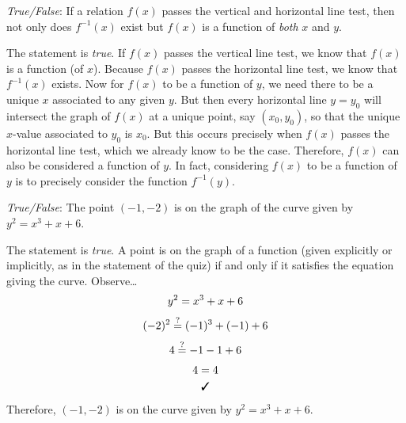 \documentclass[11pt,letterpaper]{article}
\begin{document}
\quizsol \textit{True/False}: If a relation $f(x)$ passes the vertical and horizontal line test, then not only does $f^{-1}(x)$ exist but $f(x)$ is a function of \textit{both} $x$ and $y$. \pspace

\sol The statement is \textit{true}. If $f(x)$ passes the vertical line test, we know that $f(x)$ is a function (of $x$). Because $f(x)$ passes the horizontal line test, we know that $f^{-1}(x)$ exists. Now for $f(x)$ to be a function of $y$, we need there to be a unique $x$ associated to any given $y$. But then every horizontal line $y= y_0$ will intersect the graph of $f(x)$ at a unique point, say $(x_0, y_0)$, so that the unique $x$-value associated to $y_0$ is $x_0$. But this occurs precisely when $f(x)$ passes the horizontal line test, which we already know to be the case. Therefore, $f(x)$ can also be considered a function of $y$. In fact, considering $f(x)$ to be a function of $y$ is to precisely consider the function $f^{-1}(y)$. \pvspace{0.8cm}



\quizsol \textit{True/False}: The point $(-1, -2)$ is on the graph of the curve given by $y^2= x^3 + x + 6$. \pspace

\sol The statement is \textit{true}. A point is on the graph of a function (given explicitly or implicitly, as in the statement of the quiz) if and only if it satisfies the equation giving the curve. Observe\dots
	\[
	\begin{gathered}
	y^2 = x^3 + x + 6 \\[0.1cm]
	(-2)^2 \stackrel{?}{=} (-1)^3 + (-1) + 6 \\[0.1cm]
	4 \stackrel{?}{=} -1 - 1 + 6 \\[0.1cm]
	4 = 4 \\
	\text{\cmark}
	\end{gathered}
	\]
Therefore, $(-1, -2)$ is on the curve given by $y^2= x^3 + x + 6$. 
\end{document}
